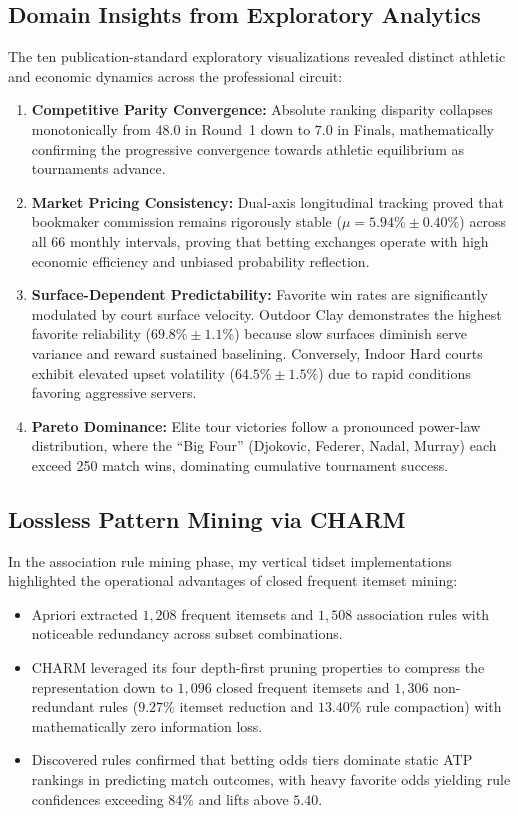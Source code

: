 \documentclass[10pt,journal]{IEEEtran}
\begin{document}
\subsection{Domain Insights from Exploratory Analytics}
The ten publication-standard exploratory visualizations revealed distinct athletic and economic dynamics across the professional circuit:
\begin{enumerate}
    \item \textbf{Competitive Parity Convergence:} Absolute ranking disparity collapses monotonically from $48.0$ in Round~1 down to $7.0$ in Finals, mathematically confirming the progressive convergence towards athletic equilibrium as tournaments advance.
    \item \textbf{Market Pricing Consistency:} Dual-axis longitudinal tracking proved that bookmaker commission remains rigorously stable ($\mu = 5.94\% \pm 0.40\%$) across all 66 monthly intervals, proving that betting exchanges operate with high economic efficiency and unbiased probability reflection.
    \item \textbf{Surface-Dependent Predictability:} Favorite win rates are significantly modulated by court surface velocity. Outdoor Clay demonstrates the highest favorite reliability ($69.8\% \pm 1.1\%$) because slow surfaces diminish serve variance and reward sustained baselining. Conversely, Indoor Hard courts exhibit elevated upset volatility ($64.5\% \pm 1.5\%$) due to rapid conditions favoring aggressive servers.
    \item \textbf{Pareto Dominance:} Elite tour victories follow a pronounced power-law distribution, where the ``Big Four'' (Djokovic, Federer, Nadal, Murray) each exceed 250 match wins, dominating cumulative tournament success.
\end{enumerate}

\subsection{Lossless Pattern Mining via CHARM}
In the association rule mining phase, my vertical tidset implementations highlighted the operational advantages of closed frequent itemset mining:
\begin{itemize}
    \item Apriori extracted $1,208$ frequent itemsets and $1,508$ association rules with noticeable redundancy across subset combinations.
    \item CHARM leveraged its four depth-first pruning properties to compress the representation down to $1,096$ closed frequent itemsets and $1,306$ non-redundant rules ($9.27\%$ itemset reduction and $13.40\%$ rule compaction) with mathematically zero information loss.
    \item Discovered rules confirmed that betting odds tiers dominate static ATP rankings in predicting match outcomes, with heavy favorite odds yielding rule confidences exceeding $84\%$ and lifts above $5.40$.
\end{itemize}
\end{document}
